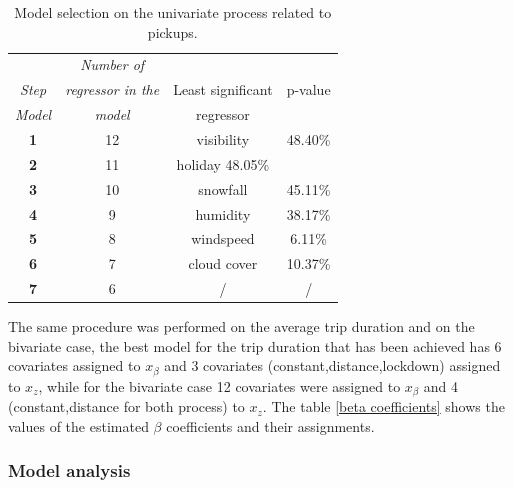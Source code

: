  \begin{table}[h!]
	\centering
	\renewcommand\arraystretch{1.3}
	\begin{tabular}{c|c|c|c}
		\hline
		\textit{} & \textit{Number of}  &  &    \\
		\textit{Step} & \textit{regressor in the}  & Least significant & p-value \\
		\textit{Model} & \textit{model}  & regressor &  \\
		\hline
		\textbf{1} & \num{12} & visibility & \num{48.40}\%  \\
		\hline
		\textbf{2} & \num{11} & holiday \num{48.05}\%  \\
		\hline
		\textbf{3} & \num{10} & snowfall & \num{45.11}\%  \\
		\hline
		\textbf{4} & \num{9} & humidity & \num{38.17}\%  \\
		\hline
		\textbf{5} & \num{8} & windspeed & \num{6.11}\% \\
		\hline
		\textbf{6} & \num{7} & cloud cover & \num{10.37}\%  \\
		\hline
		\textbf{7} & \num{6} & /  &  / \\
		\hline
	\end{tabular}
	\caption[Model selection on the univariate process related to pickups]{Model selection on the univariate process related to pickups.}
	\label{Model_selection_pickups}
\end{table}
\noindent


The same procedure was performed on the average trip duration and on the bivariate case, the best model for the trip duration that has been achieved has \num{6} covariates assigned to $x_{\beta}$ and \num{3} covariates (constant,distance,lockdown) assigned to $x_{z}$,
while for the bivariate case \num{12} covariates were assigned to $x_{\beta}$  and \num{4} (constant,distance for both process) to $x_{z}$. 
The table \ref{beta coefficients} shows the values of the estimated $\beta$ coefficients and their assignments.






\subsubsection{Model analysis}


